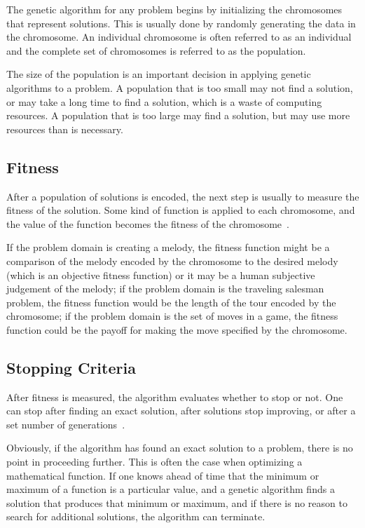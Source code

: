 The genetic algorithm for any problem begins by initializing the chromosomes
that represent solutions. This is usually done by randomly generating the data
in the chromosome. An individual chromosome is often referred to as an
individual and the complete set of chromosomes is referred to as the population.

The size of the population is an important decision in applying genetic
algorithms to a problem. A population that is too small may not find a solution,
or may take a long time to find a solution, which is a waste of computing
resources. A population that is too large may find a solution, but may use more
resources than is necessary.

\subsection{Fitness}

After a population of solutions is encoded, the next step is usually to measure
the fitness of the solution. Some kind of function is applied to each
chromosome, and the value of the function becomes the fitness of the 
chromosome~\cite{haupt2004practical}.

If the problem domain is creating a melody, the fitness function might be a
comparison of the melody encoded by the chromosome to the desired melody (which
is an objective fitness function) or it may be a human subjective judgement of
the melody; if the problem domain is the traveling salesman problem, the fitness
function would be the length of the tour encoded by the chromosome; if the
problem domain is the set of moves in a game, the fitness function could be the
payoff for making the move specified by the chromosome.

\subsection{Stopping Criteria}

After fitness is measured, the algorithm evaluates whether to stop or not. One
can stop after finding an exact solution, after solutions stop improving, or
after a set number of generations~\cite{dejong2006evolutionary}.

Obviously, if the algorithm has found an exact solution to a problem, there is
no point in proceeding further. This is often the case when optimizing a
mathematical function. If one knows ahead of time that the minimum or maximum of
a function is a particular value, and a genetic algorithm finds a solution that
produces that minimum or maximum, and if there is no reason to search for
additional solutions, the algorithm can terminate.

